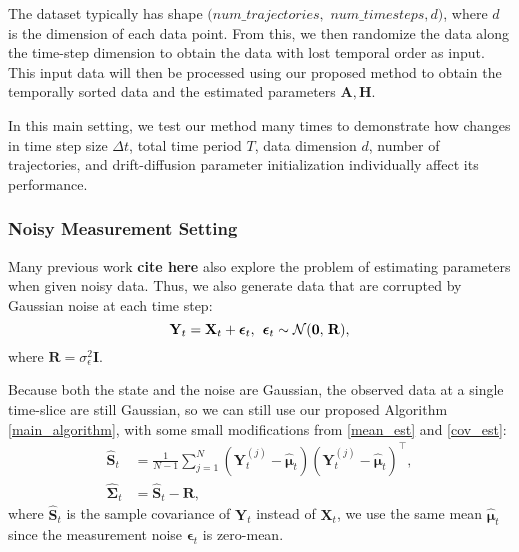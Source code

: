 \documentclass[conference]{IEEEtran}
\begin{document}
The dataset typically has shape $(num\_trajectories,$ $num\_timesteps, d)$, where $d$ is the dimension of each data point. From this, we then randomize the data along the time-step dimension to obtain the data with lost temporal order as input. This input data will then be processed using our proposed method to obtain the temporally sorted data and the estimated parameters $\mathbf{A}, \mathbf{H}$.

In this main setting, we test our method many times to demonstrate how changes in time step size $\Delta t$, total time period $T$, data dimension $d$, number of trajectories, and drift-diffusion parameter initialization individually affect its performance.
\subsubsection{Noisy Measurement Setting}
Many previous work \textbf{cite here} also explore the problem of estimating parameters when given noisy data. Thus, we also generate data that are corrupted by Gaussian noise at each time step:
\[
    \mathbf{Y}_t = \mathbf{X}_t + \boldsymbol{\epsilon}_t, \hspace{0.15cm}
    \boldsymbol{\epsilon}_t \sim \mathcal{N}(\mathbf{0}, \hspace{0.05cm} \mathbf{R}),
\]
where $\mathbf{R} = \sigma_\epsilon^2\mathbf{I}$.

Because both the state and the noise are Gaussian, the observed data at a single time-slice are still Gaussian, so we can still use our proposed Algorithm \ref{main_algorithm}, with some small modifications from \eqref{mean_est} and \eqref{cov_est}:
\begin{align*}
    \hat{\mathbf{S}}_t &= \frac{1}{N-1}\sum_{j=1}^{N}(\mathbf{Y}^{(j)}_t - \hat{\boldsymbol{\mu}}_t)(\mathbf{Y}^{(j)}_t - \hat{\boldsymbol{\mu}}_t)^{\top},\\
    \hat{\boldsymbol{\Sigma}}_t &= \hat{\mathbf{S}}_t - \mathbf{R},
\end{align*}
where $\hat{\mathbf{S}}_t$ is the sample covariance of $\mathbf{Y}_t$ instead of $\mathbf{X}_t$, we use the same mean $\hat{\boldsymbol{\mu}}_t$ since the measurement noise $\boldsymbol{\epsilon}_t$ is zero-mean.
\end{document}
